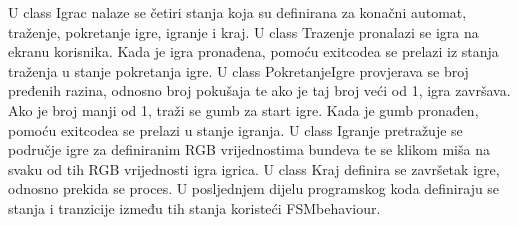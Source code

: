 \documentclass[a4paper,12pt]{foi}
\begin{document}
U class Igrac nalaze se četiri stanja koja su definirana za konačni automat, traženje, pokretanje igre, igranje i kraj. U class Trazenje pronalazi se igra na ekranu korisnika. Kada je igra pronađena, pomoću exitcodea se prelazi iz stanja traženja u stanje pokretanja igre. U class PokretanjeIgre provjerava se broj pređenih razina, odnosno broj pokušaja te ako je taj broj veći od 1, igra završava. Ako je broj manji od 1, traži se gumb za start igre. Kada je gumb pronađen, pomoću exitcodea se prelazi u stanje igranja. U class Igranje pretražuje se područje igre za definiranim RGB vrijednostima bundeva te se klikom miša na svaku od tih RGB vrijednosti igra igrica. U class Kraj definira se završetak igre, odnosno prekida se proces. U posljednjem dijelu programskog koda definiraju se stanja i tranzicije između tih stanja koristeći FSMbehaviour.
\lstset{commentstyle=\textit,language=python}
\end{document}
